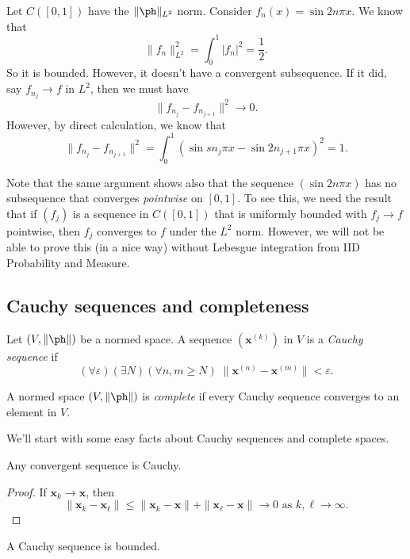 \documentclass[a4paper]{article}
\begin{document}
\begin{eg}
  Let $C([0, 1])$ have the $\|\ph \|_{L^2}$ norm. Consider $f_n(x) = \sin 2n\pi x$. We know that
  \[
    \|f_n\|^2_{L^2} = \int_0^1 |f_n|^2 = \frac{1}{2}.
  \]
  So it is bounded. However, it doesn't have a convergent subsequence. If it did, say $f_{n_j} \to f$ in $L^2$, then we must have
  \[
    \|f_{n_j} - f_{n_{j + 1}}\|^2 \to 0.
  \]
  However, by direct calculation, we know that
  \[
    \|f_{n_j} - f_{n_{j + 1}}\|^2 = \int_0^1 (\sin sn_j \pi x - \sin 2n_{j + 1}\pi x)^2 = 1.
  \]
\end{eg}
Note that the same argument shows also that the sequence $(\sin 2n\pi x)$ has no subsequence that converges \emph{pointwise} on $[0, 1]$. To see this, we need the result that if $(f_j)$ is a sequence in $C([0, 1])$ that is uniformly bounded with $f_j \to f$ pointwise, then $f_j$ converges to $f$ under the $L^2$ norm. However, we will not be able to prove this (in a nice way) without Lebesgue integration from IID Probability and Measure.

\subsection{Cauchy sequences and completeness}
\begin{defi}
  Let $(V, \|\ph \|)$ be a normed space. A sequence $(\mathbf{x}^{(k)})$ in $V$ is a \emph{Cauchy sequence} if
  \[
    (\forall \varepsilon)(\exists N)(\forall n, m \geq N)\; \|\mathbf{x}^{(n)} - \mathbf{x}^{(m)}\| < \varepsilon.
  \]
\end{defi}

\begin{defi}
  A normed space $(V, \|\ph\|)$ is \emph{complete} if every Cauchy sequence converges to an element in $V$.
\end{defi}

We'll start with some easy facts about Cauchy sequences and complete spaces.
\begin{prop}
  Any convergent sequence is Cauchy.
\end{prop}

\begin{proof}
  If $\mathbf{x}_k \to \mathbf{x}$, then
  \[
    \|\mathbf{x}_k - \mathbf{x}_\ell\| \leq \|\mathbf{x}_k - \mathbf{x}\| + \|\mathbf{x}_\ell - \mathbf{x}\| \to 0 \text{ as }k, \ell \to \infty.
  \]
\end{proof}

\begin{prop}
  A Cauchy sequence is bounded.
\end{prop}
\end{document}
